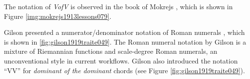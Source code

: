 The notation of \emph{VofV} is observed in the book of Mokrejs \cite{mokrejs1913lessons}, which is shown in Figure \ref{img:mokrejs1913lessons079}.

Gilson presented a numerator/denominator notation of Roman numerals \cite{gilson1919traite}, which is shown in \ref{fig:gilson1919traite049}.
The Roman numeral notation by Gilson is a mixture of Riemannian functions and scale-degree Roman numerals, an unconventional style in current workflows.
Gilson also introduced the notation ``VV'' for \emph{dominant of the dominant} chords (see Figure \ref{fig:gilson1919traite049}).





